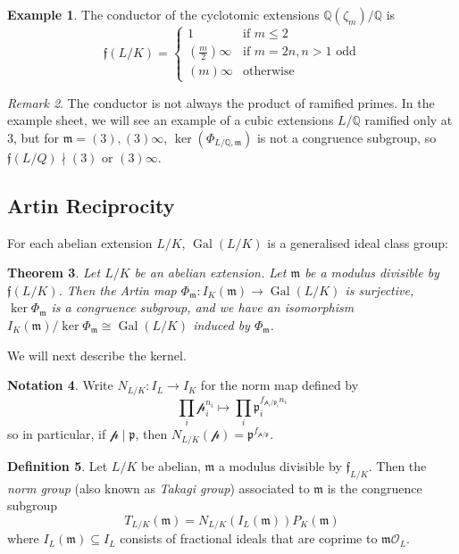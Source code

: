 \documentclass[11pt]{article}
\theoremstyle{definition}
\newtheorem{definition}{Definition}[section]
\newtheorem{example}[definition]{Example}
\newtheorem{notation}[definition]{Notation}
\theoremstyle{plain}
\newtheorem{theorem}[definition]{Theorem}
\theoremstyle{remark}
\newtheorem{remark}[definition]{Remark}
\DeclareMathOperator{\Gal}{Gal}
\newcommand{\QQ}{\mathbb{Q}}
\newcommand{\cO}{\mathcal{O}}
\newcommand{\cp}{\mathcal{p}}
\newcommand{\ff}{\mathfrak{f}}
\newcommand{\fp}{\mathfrak{p}}
\newcommand{\fm}{\mathfrak{m}}
\begin{document}
\begin{example}\label{eg:3_4}
    The conductor of the cyclotomic extensions $\QQ(\zeta_m)/\QQ$ is
    \begin{equation*}
        \ff(L/K) =
        \begin{cases}
            1 & \text{if } m \le 2\\
            (\frac{m}{2}) \infty &\text{if } m = 2n, n>1 \text{ odd}\\
            (m) \infty &\text{otherwise}
        \end{cases}
    \end{equation*}
\end{example}

\begin{remark}\label{rem:3_5}
    The conductor is not always the product of ramified primes. In the example sheet, we will see an example of a cubic extensions $L/\QQ$ ramified only at $3$, but for $\fm = (3), (3)\infty$, $\ker(\Phi_{L/\QQ, \fm})$ is not a congruence subgroup, so $\ff(L/Q) \nmid (3)$ or $(3) \infty$.
\end{remark}

\subsection{Artin Reciprocity}

For each abelian extension $L/K$, $\Gal(L/K)$ is a generalised ideal class group:

\begin{theorem}\label{thm:3_6}
    Let $L/K$ be an abelian extension. Let $\fm$ be a modulus divisible by $\ff(L/K)$. Then the Artin map $\Phi_\fm : I_K(\fm) \to \Gal(L/K)$ is surjective, $\ker{\Phi_\fm}$ is a congruence subgroup, and we have an isomorphism $I_K(\fm)/\ker \Phi_\fm \cong \Gal(L/K)$ induced by $\Phi_\fm$.
\end{theorem}

We will next describe the kernel.

\begin{notation}\label{not:3_7}
    Write $N_{L/K} : I_L \to I_K$ for the norm map defined by
    \begin{equation*}
        \prod_i \cp_i^{n_i} \mapsto \prod_i \fp_i^{f_{\cp_i / \fp_i} n_i}
    \end{equation*}
    so in particular, if $\cp \mid \fp$, then $N_{L/K}(\cp) = \fp^{f_{\cp/\fp}}$.
\end{notation}

\begin{definition}\label{def:3_8}
    Let $L/K$ be abelian, $\fm$ a modulus divisible by $\ff_{L/K}$. Then the \emph{norm group} (also known as \emph{Takagi group}) associated to $\fm$ is the congruence subgroup
    \begin{equation*}
        T_{L/K}(\fm) = N_{L/K}(I_L(\fm))P_K(\fm)
    \end{equation*}
    where $I_L(\fm) \subseteq I_L$ consists of fractional ideals that are coprime to $\fm \cO_L$.
\end{definition}
\end{document}
